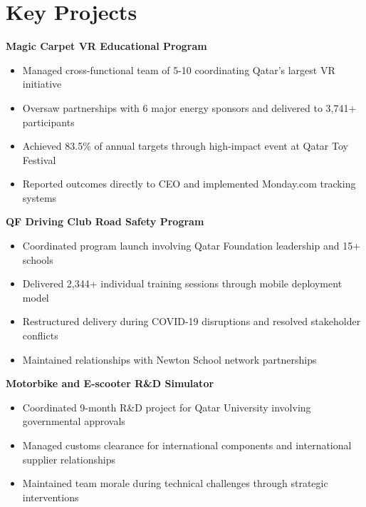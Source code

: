 \documentclass[a4paper,12pt]{article}
\begin{document}

\section{Key Projects}

\textbf{Magic Carpet VR Educational Program}
\begin{itemize}[nosep,after=\strut, leftmargin=1em, itemsep=2pt,label=--]
\item Managed cross-functional team of 5-10 coordinating Qatar's largest VR initiative
\item Oversaw partnerships with 6 major energy sponsors and delivered to 3,741+ participants
\item Achieved 83.5\% of annual targets through high-impact event at Qatar Toy Festival
\item Reported outcomes directly to CEO and implemented Monday.com tracking systems
\end{itemize}

\textbf{QF Driving Club Road Safety Program}
\begin{itemize}[nosep,after=\strut, leftmargin=1em, itemsep=2pt,label=--]
\item Coordinated program launch involving Qatar Foundation leadership and 15+ schools
\item Delivered 2,344+ individual training sessions through mobile deployment model
\item Restructured delivery during COVID-19 disruptions and resolved stakeholder conflicts
\item Maintained relationships with Newton School network partnerships
\end{itemize}

\textbf{Motorbike and E-scooter R\&D Simulator}
\begin{itemize}[nosep,after=\strut, leftmargin=1em, itemsep=2pt,label=--]
\item Coordinated 9-month R\&D project for Qatar University involving governmental approvals
\item Managed customs clearance for international components and international supplier relationships
\item Maintained team morale during technical challenges through strategic interventions
\end{itemize}
\end{document}
